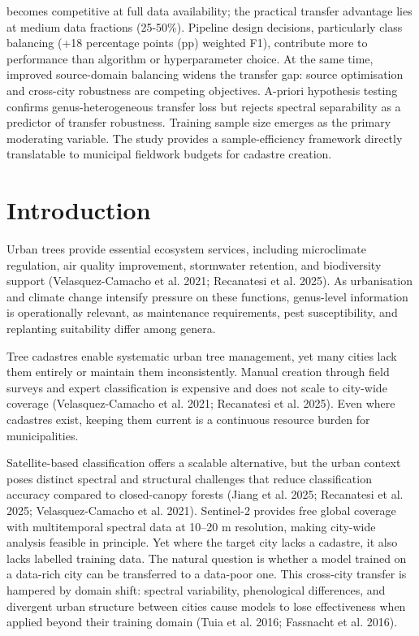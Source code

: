 \documentclass[11pt,a4paper]{scrartcl}
\begin{document}
becomes competitive at full data availability; the practical transfer
advantage lies at medium data fractions (25-50\%). Pipeline design
decisions, particularly class balancing (+18 percentage points (pp)
weighted F1), contribute more to performance than algorithm or
hyperparameter choice. At the same time, improved source-domain
balancing widens the transfer gap: source optimisation and cross-city
robustness are competing objectives. A-priori hypothesis testing
confirms genus-heterogeneous transfer loss but rejects spectral
separability as a predictor of transfer robustness. Training sample size
emerges as the primary moderating variable. The study provides a
sample-efficiency framework directly translatable to municipal fieldwork
budgets for cadastre creation.
\clearpage
{}
\setcounter{page}{2}

\section{Introduction}\label{introduction}

Urban trees provide essential ecosystem services, including microclimate
regulation, air quality improvement, stormwater retention, and
biodiversity support ({Velasquez-Camacho et al.} 2021; Recanatesi et al.
2025). As urbanisation and climate change intensify pressure on these
functions, genus-level information is operationally relevant, as
maintenance requirements, pest susceptibility, and replanting
suitability differ among genera.

Tree cadastres enable systematic urban tree management, yet many cities
lack them entirely or maintain them inconsistently. Manual creation
through field surveys and expert classification is expensive and does
not scale to city-wide coverage ({Velasquez-Camacho et al.} 2021;
Recanatesi et al. 2025). Even where cadastres exist, keeping them
current is a continuous resource burden for municipalities.

Satellite-based classification offers a scalable alternative, but the
urban context poses distinct spectral and structural challenges that
reduce classification accuracy compared to closed-canopy forests (Jiang
et al. 2025; Recanatesi et al. 2025; {Velasquez-Camacho et al.} 2021).
Sentinel-2 provides free global coverage with multitemporal spectral
data at 10--20 m resolution, making city-wide analysis feasible in
principle. Yet where the target city lacks a cadastre, it also lacks
labelled training data. The natural question is whether a model trained
on a data-rich city can be transferred to a data-poor one. This
cross-city transfer is hampered by domain shift: spectral variability,
phenological differences, and divergent urban structure between cities
cause models to lose effectiveness when applied beyond their training
domain (Tuia et al. 2016; Fassnacht et al. 2016).
\end{document}
